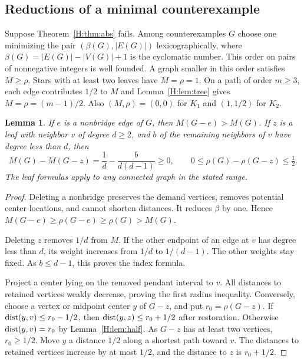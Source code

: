 \documentclass[11pt,a4paper]{article}
\newtheorem{lemma}[theorem]{Lemma}
\theoremstyle{remark}\newtheorem{remark}[theorem]{Remark}
\numberwithin{equation}{section}
\begin{document}
\subsection{Reductions of a minimal counterexample}\label{H:sec:red}
Suppose Theorem~\ref{H:thm:abs} fails. Among counterexamples $G$ choose
one minimizing the pair $(\beta(G),|E(G)|)$ lexicographically, where
$\beta(G)=|E(G)|-|V(G)|+1$ is the cyclomatic number. This order on
pairs of nonnegative integers is well founded. A graph smaller in this
order satisfies $M\ge\rho$. Stars with at least two leaves have
$M=\rho=1$. On a path of order $m\ge3$, each edge contributes $1/2$
to $M$ and Lemma~\ref{H:lem:tree} gives $M=\rho=(m-1)/2$. Also
$(M,\rho)=(0,0)$ for $K_1$ and $(1,1/2)$ for $K_2$.

\begin{lemma}\label{H:lem:delete}
If $e$ is a nonbridge edge of $G$, then $M(G-e)>M(G)$. If $z$ is
a leaf with neighbor $v$ of degree $d\ge2$, and $b$ of the remaining
neighbors of $v$ have degree less than $d$, then
\begin{equation}\label{H:eq:oneleaf}
 M(G)-M(G-z)=\frac1d-\frac{b}{d(d-1)}\ge0,\qquad
 0\le\rho(G)-\rho(G-z)\le\tfrac12.
\end{equation}
The leaf formulas apply to any connected graph in the stated range.
\end{lemma}
\begin{proof}
Deleting a nonbridge preserves the demand vertices, removes potential
center locations, and cannot shorten distances. It reduces $\beta$ by
one. Hence $M(G-e)\ge\rho(G-e)\ge\rho(G)>M(G)$.

Deleting $z$ removes $1/d$ from $M$. If the other endpoint of an edge
at $v$ has degree less than $d$, its weight increases from $1/d$ to
$1/(d-1)$. The other weights stay fixed. As $b\le d-1$, this proves
the index formula.

Project a center lying on the removed pendant interval to $v$. All
distances to retained vertices weakly decrease, proving the first
radius inequality. Conversely, choose a vertex or midpoint center $y$
of $G-z$, and put $r_0=\rho(G-z)$. If $\operatorname{dist}(y,v)\le r_0-1/2$,
then $\operatorname{dist}(y,z)\le r_0+1/2$ after restoration. Otherwise
$\operatorname{dist}(y,v)=r_0$ by Lemma~\ref{H:lem:half}. As $G-z$ has at least two
vertices, $r_0\ge1/2$. Move $y$ a distance $1/2$ along a shortest
path toward $v$. The distances to retained vertices increase by at
most $1/2$, and the distance to $z$ is $r_0+1/2$.
\end{proof}
\end{document}
